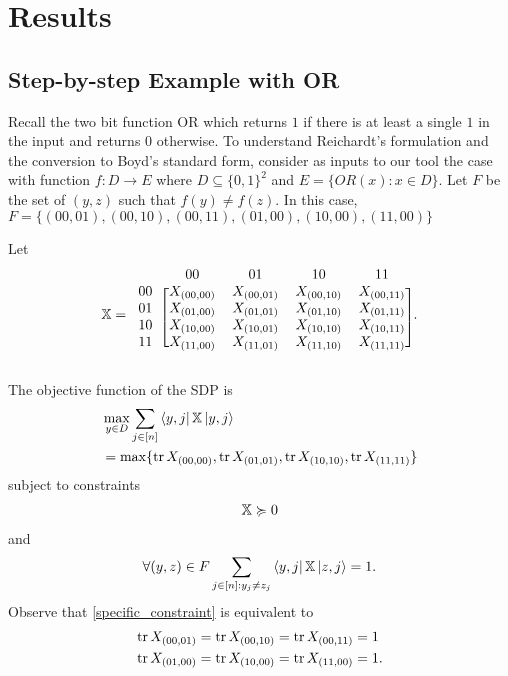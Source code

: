 \section{Results}

\subsection{Step-by-step Example with OR}
Recall the two bit function OR which returns $1$ if there
is at least a single $1$ in the input and returns $0$ otherwise.
To understand Reichardt's formulation and the conversion
to Boyd's standard form, consider as inputs to our tool
the case with function $f: D \rightarrow E$ where
$D \subseteq {\{0,1\}}^2$ and $E =\{OR(x): x \in D \}$.
Let $F$ be the set of $(y,z)$ such that $f(y) \neq f(z)$. In this
case, $F = \{(00,01), (00,10), (00,11), (01,00), (10,00), (11,00)\}$

Let
\begin{align}
\X = \begin{blockarray}{ccccc}
\qquad & 00 & 01 & 10 & 11 \\
\begin{block}{c[cccc]}
  00 & X_{(00,00)} & X_{(00,01)} & X_{(00,10)} & X_{(00,11)}\\
  01 & X_{(01,00)} & X_{(01,01)} & X_{(01,10)} & X_{(01,11)}\\
  10 & X_{(10,00)} & X_{(10,01)} & X_{(10,10)} & X_{(10,11)}\\
  11 & X_{(11,00)} & X_{(11,01)} & X_{(11,10)} & X_{(11,11)}\\
\end{block}
\end{blockarray}. \nonumber 
\end{align}


The objective function of the SDP is
\begin{align} \label{eq:reichardtObj} 
    &\max_{y \in D} \sum_{j \in [n]}
    \bra{y,j}\operatorname{\mathbb{X}}\ket{y,j} \\
    &= \max\{ \operatorname{\text{tr}}{X_{(00,00)}}, \operatorname{\text{tr}}{X_{(01,01)}}, \operatorname{\text{tr}}{X_{(10,10)}}, \operatorname{\text{tr}}{X_{(11,11)}} \} \nonumber
\end{align}
subject to constraints
\begin{align}
    \operatorname{\mathbb{X}} \succcurlyeq 0  \nonumber 
\end{align}
and
\begin{align}\label{specific_constraint}
    \forall (y,z) \in F \sum_{j \in [n]: y_j \ne z_j} 
    \bra{y,j} \operatorname{\mathbb{X}} \ket{z, j} = 1.
\end{align}
Observe that \cref{specific_constraint}
is equivalent to
\begin{align}
    \operatorname{\text{tr}}{X_{(00,01)}} &= \operatorname{\text{tr}}{X_{(00,10)}} = \operatorname{\text{tr}}{X_{(00,11)}} = 1 \nonumber \\
    \operatorname{\text{tr}}{X_{(01,00)}} &= \operatorname{\text{tr}}{X_{(10,00)}} = \operatorname{\text{tr}}{X_{(11,00)}} = 1. \nonumber
\end{align}


